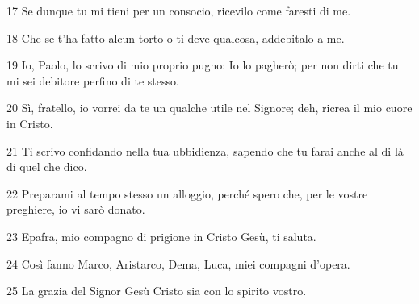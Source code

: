 \par 17 Se dunque tu mi tieni per un consocio, ricevilo come faresti di me.
\par 18 Che se t'ha fatto alcun torto o ti deve qualcosa, addebitalo a me.
\par 19 Io, Paolo, lo scrivo di mio proprio pugno: Io lo pagherò; per non dirti che tu mi sei debitore perfino di te stesso.
\par 20 Sì, fratello, io vorrei da te un qualche utile nel Signore; deh, ricrea il mio cuore in Cristo.
\par 21 Ti scrivo confidando nella tua ubbidienza, sapendo che tu farai anche al di là di quel che dico.
\par 22 Preparami al tempo stesso un alloggio, perché spero che, per le vostre preghiere, io vi sarò donato.
\par 23 Epafra, mio compagno di prigione in Cristo Gesù, ti saluta.
\par 24 Così fanno Marco, Aristarco, Dema, Luca, miei compagni d'opera.
\par 25 La grazia del Signor Gesù Cristo sia con lo spirito vostro.


